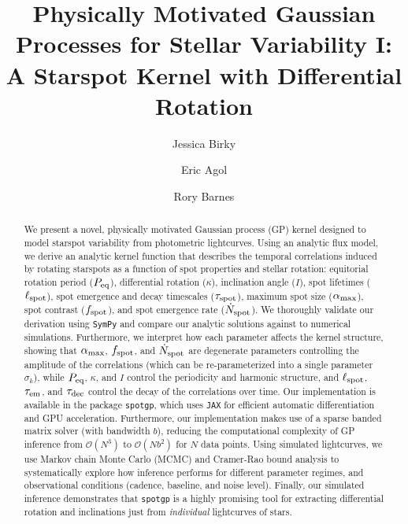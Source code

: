 \documentclass[preprint]{aastex702}
\newcommand{\code}[1]{{\texttt{#1}}}
\begin{document}
\title{\sc Physically Motivated Gaussian Processes for Stellar Variability I: \\
A Starspot Kernel with Differential Rotation}


\author[0000-0002-7961-6881]{Jessica Birky}
\author[0000-0002-0802-9145]{Eric Agol}
\author[0000-0001-6487-5445]{Rory Barnes}

\begin{abstract}
We present a novel, physically motivated Gaussian process (GP) kernel designed to model starspot variability from photometric lightcurves. Using an analytic flux model, we derive an analytic kernel function that describes the temporal correlations induced by rotating starspots as a function of spot properties and stellar rotation: equitorial rotation period ($P_{\rm eq}$), differential rotation ($\kappa$), inclination angle ($I$), spot lifetimes ($\ell_{\rm spot}$), spot emergence and decay timescales ($\tau_{\rm spot}$), maximum spot size ($\alpha_{\rm max}$), spot contrast ($f_{\rm spot}$), and spot emergence rate ($\dot{N}_{\rm spot}$). We thoroughly validate our derivation using \code{SymPy} and compare our analytic solutions against to numerical simulations. Furthermore, we interpret how each parameter affects the kernel structure, showing that $\alpha_{\rm max}$, $f_{\rm spot}$, and $\dot{N}_{\rm spot}$ are degenerate parameters controlling the amplitude of the correlations (which can be re-parameterized into a single parameter $\sigma_k$), while $P_{\rm eq}$, $\kappa$, and $I$ control the periodicity and harmonic structure, and $\ell_{\rm spot}$, $\tau_{\rm em}$, and $\tau_{\rm dec}$ control the decay of the correlations over time. Our implementation is available in the package \code{spotgp}, which uses \code{JAX} for efficient automatic differentiation and GPU acceleration. Furthermore, our implementation makes use of a sparse banded matrix solver (with bandwidth $b$), reducing the computational complexity of GP inference from $\mathcal{O}(N^3)$ to $\mathcal{O}(Nb^2)$ for $N$ data points. Using simulated lightcurves, we use Markov chain Monte Carlo (MCMC) and Cramer-Rao bound analysis to systematically explore how inference performs for different parameter regimes, and observational conditions (cadence, baseline, and noise level). Finally, our simulated inference demonstrates that \code{spotgp} is a highly promising tool for extracting differential rotation and inclinations just from \emph{individual} lightcurves of stars. \\
\end{abstract}
\end{document}
